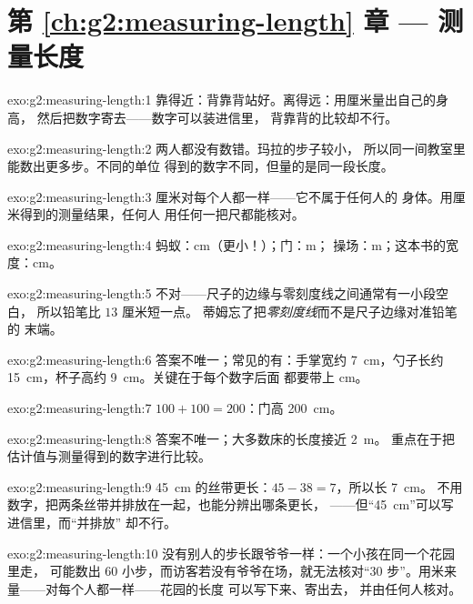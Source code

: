\section*{第 \ref{ch:g2:measuring-length} 章 --- 测量长度}

\begin{solution}{exo:g2:measuring-length:1}
靠得近：背靠背站好。离得远：用厘米量出自己的身高，
然后把数字寄去——数字可以装进信里，
背靠背的比较却不行。
\end{solution}

\begin{solution}{exo:g2:measuring-length:2}
两人都没有数错。玛拉的步子较小，
所以同一间教室里能数出更多步。不同的单位
得到的数字不同，但量的是同一段长度。
\end{solution}

\begin{solution}{exo:g2:measuring-length:3}
厘米对每个人都一样——它不属于任何人的
身体。用厘米得到的测量结果，任何人
用任何一把尺都能核对。
\end{solution}

\begin{solution}{exo:g2:measuring-length:4}
蚂蚁：\unit{cm}（更小！）；门：\unit{m}；
操场：\unit{m}；这本书的宽度：\unit{cm}。
\end{solution}

\begin{solution}{exo:g2:measuring-length:5}
不对——尺子的边缘与零刻度线之间通常有一小段空白，
所以铅笔比 $13$ 厘米短一点。
蒂姆忘了把\emph{零刻度线}而不是尺子边缘对准铅笔的
末端。
\end{solution}

\begin{solution}{exo:g2:measuring-length:6}
答案不唯一；常见的有：手掌宽约 \qty{7}{cm}，勺子长约
\qty{15}{cm}，杯子高约 \qty{9}{cm}。关键在于每个数字后面
都要带上 \unit{cm}。
\end{solution}

\begin{solution}{exo:g2:measuring-length:7}
$100 + 100 = 200$：门高 \qty{200}{cm}。
\end{solution}

\begin{solution}{exo:g2:measuring-length:8}
答案不唯一；大多数床的长度接近 \qty{2}{m}。
重点在于把估计值与测量得到的数字进行比较。
\end{solution}

\begin{solution}{exo:g2:measuring-length:9}
\qty{45}{cm} 的丝带更长：$45 - 38 = 7$，所以长 \qty{7}{cm}。
不用数字，把两条丝带并排放在一起，也能分辨出哪条更长，
——但“\qty{45}{cm}”可以写进信里，而“并排放”
却不行。
\end{solution}

\begin{solution}{exo:g2:measuring-length:10}
没有别人的步长跟爷爷一样：一个小孩在同一个花园里走，
可能数出 $60$ 小步，而访客若没有爷爷在场，就无法核对“$30$
步”。用米来量——对每个人都一样——花园的长度
可以写下来、寄出去，
并由任何人核对。
\end{solution}
